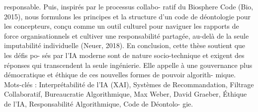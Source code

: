 responsable. Puis, inspirés par le processus collabo-
ratif du Biosphere Code (Bio, 2015), nous formulons
les principes et la structure d’un code de déontologie
pour les concepteurs, conçu comme un outil culturel
pour naviguer les rapports de force organisationnels et
cultiver une responsabilité partagée, au-delà de la seule
imputabilité individuelle (Neuer, 2018).
En conclusion, cette thèse soutient que les défis po-
sés par l’IA moderne sont de nature socio-technique et
exigent des réponses qui transcendent la seule ingénierie. 
Elle appelle à une gouvernance plus démocratique
et éthique de ces nouvelles formes de pouvoir algorith-
mique.
Mots-clés : Interprétabilité de l’IA (XAI), Systèmes de
Recommandation, Filtrage Collaboratif, Bureaucratie
Algorithmique, Max Weber, David Graeber, Éthique de
l’IA, Responsabilité Algorithmique, Code de Déontolo-
gie.


